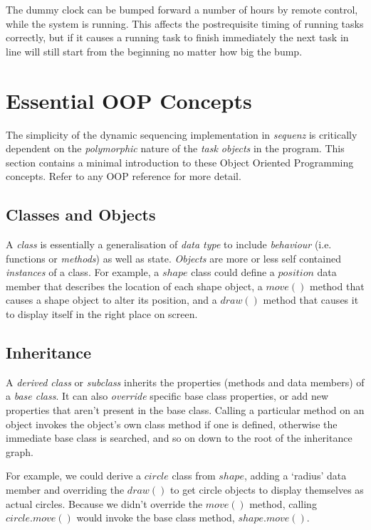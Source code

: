 \documentclass[11pt,a4paper]{article}
\begin{document}
The dummy clock can be bumped forward a number of hours by remote
control, while the system is running. This affects the postrequisite
timing of running tasks correctly, but if it causes a running task to
finish immediately the next task in line will still start from the
beginning no matter how big the bump.


\appendix

\section{Essential OOP Concepts}

The simplicity of the dynamic sequencing implementation in {\em sequenz}
is critically dependent on the {\em polymorphic} nature of the {\em task
objects} in the program.  This section contains a minimal introduction
to these Object Oriented Programming concepts.  Refer to any OOP
reference for more detail.

\subsection{Classes and Objects}

A {\em class} is essentially a generalisation of {\em data type} to
include {\em behaviour} (i.e. functions or {\em methods}) as well as
state.  {\em Objects} are more or less self contained {\em instances} of
a class. For example, a $shape$ class could define a $position$ data
member that describes the location of each shape object, a $move()$
method that causes a shape object to alter its position, and a $draw()$
method that causes it to display itself in the right place on screen.

\subsection{Inheritance}

A {\em derived class} or {\em subclass} inherits the properties (methods
and data members) of a {\em base class}. It can also {\em override}
specific base class properties, or add new properties that aren't
present in the base class. Calling a particular method on an object
invokes the object's own class method if one is defined, otherwise the
immediate base class is searched, and so on down to the root of the
inheritance graph. 

For example, we could derive a $circle$ class from $shape$, adding a
`radius' data member and overriding the $draw()$ to get circle objects
to display themselves as actual circles.  Because we didn't override the
$move()$ method, calling $circle.move()$ would invoke the base class
method, $shape.move()$. 
\end{document}
